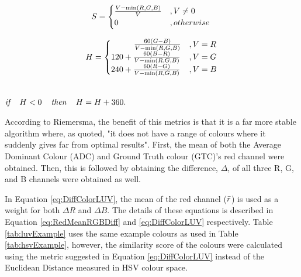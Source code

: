 \begin{equation}
\label{eq:RGBHSVconversion2}
S = \begin{cases}\frac{V - \min(R,G,B)}{V} & , V \neq 0\\
0 & , otherwise \end{cases} \\
\end{equation}

\begin{equation}
\label{eq:RGBHSVconversion3}
H = \begin{cases}
\hspace{2.8em} \frac{60(G-B)}{V-\min(R,G,B)} & ,V = R\\
120 + \frac{60(B-R)}{V-\min(R,G,B)} & ,V = G\\
240 + \frac{60(R-G)}{V-\min(R,G,B)} & ,V = B
\end{cases}
\end{equation}

\centerline{\\$\textit{if } \hspace{.8em}H< 0 \hspace{.8em}\textit{ then } \hspace{.8em}H = H+360.$}











According to Riemersma, the benefit of this metrics is that it is a far more stable algorithm where, as quoted, "it does not have a range of colours where it suddenly gives far from optimal results". First, the mean of both the Average Dominant Colour (ADC) and Ground Truth colour (GTC)'s red channel were obtained. Then, this is followed by obtaining the difference, $\Delta$, of all three R, G, and B channels were obtained as well.

In Equation \ref{eq:DiffColorLUV}, the mean of the red channel ($\bar{r}$) is used as a weight for both $\Delta{R}$ and $\Delta{B}$. The details of these equations is described in Equation \ref{eq:RedMeanRGBDiff} and \ref{eq:DiffColorLUV} respectively. Table \ref{tab:luvExample} uses the same example colours as used in Table \ref{tab:hsvExample}, however, the similarity score of the colours were calculated using the metric suggested in Equation \ref{eq:DiffColorLUV} instead of the Euclidean Distance measured in HSV colour space.


